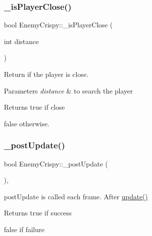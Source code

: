 \mbox{\label{class_enemy_crispy_a5e3bef4e40dfeb57ec87ea23b7a57e18}} 
\subsubsection{\texorpdfstring{\+\_\+is\+Player\+Close()}{\_isPlayerClose()}}
{\footnotesize\ttfamily bool Enemy\+Crispy\+::\+\_\+is\+Player\+Close (\begin{DoxyParamCaption}\item[{int}]{distance }\end{DoxyParamCaption})\hspace{0.3cm}{\ttfamily [protected]}}



Return if the player is close. 


\begin{DoxyParams}{Parameters}
{\em distance} & to search the player \\
\hline
\end{DoxyParams}
\begin{DoxyReturn}{Returns}
true if close 

false otherwise. 
\end{DoxyReturn}
\mbox{\label{class_enemy_crispy_a7493983cc06e648d1ac8fd80dd8c64f3}} 
\subsubsection{\texorpdfstring{\+\_\+post\+Update()}{\_postUpdate()}}
{\footnotesize\ttfamily bool Enemy\+Crispy\+::\+\_\+post\+Update (\begin{DoxyParamCaption}{ }\end{DoxyParamCaption})\hspace{0.3cm}{\ttfamily [protected]}, {\ttfamily [virtual]}}



post\+Update is called each frame. After \hyperlink{class_a_enemy_a01e3b0313d6f29bf2cafe20f711c0550}{update()} 

\begin{DoxyReturn}{Returns}
true if success 

false if failure 
\end{DoxyReturn}



